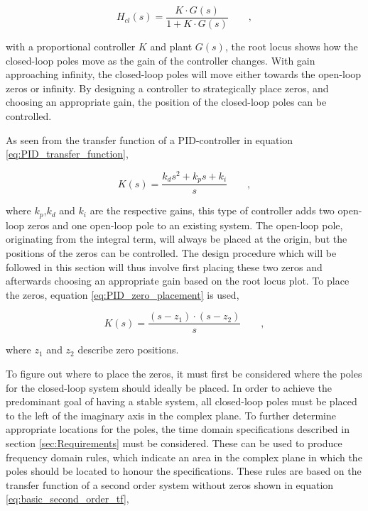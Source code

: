 \documentclass[../../main.tex]{subfiles}
\begin{document}
\begin{equation}\label{eq:closedLoopSystem}
    H_{cl}(s)=\frac{K\cdot G(s)}{1+K\cdot G(s)} \qquad ,
\end{equation}

with a proportional controller $K$ and plant $G(s)$, the root locus shows how the closed-loop poles move as the gain of the controller changes. With gain approaching infinity, the closed-loop poles will move either towards the open-loop zeros or infinity. By designing a controller to strategically place zeros, and choosing an appropriate gain, the position of the closed-loop poles can be controlled.

As seen from the transfer function of a PID-controller in equation \ref{eq:PID_transfer_function},

\begin{equation}\label{eq:PID_transfer_function}
    K(s) = \frac{k_d s^2 + k_p s + k_i}{s} \qquad ,
\end{equation}

where $k_p$,$k_d$ and $k_i$ are the respective gains, this type of controller adds two open-loop zeros and one open-loop pole to an existing system. The open-loop pole, originating from the integral term, will always be placed at the origin, but the positions of the zeros can be controlled. The design procedure which will be followed in this section will thus involve first placing these two zeros and afterwards choosing an appropriate gain based on the root locus plot. To place the zeros, equation \ref{eq:PID_zero_placement} is used, 

\begin{equation}\label{eq:PID_zero_placement}
    K(s) = \frac{(s-z_1)\cdot(s-z_2)}{s} \qquad ,
\end{equation}

where $z_1$ and $z_2$ describe zero positions.

To figure out where to place the zeros, it must first be considered where the poles for the closed-loop system should ideally be placed. In order to achieve the predominant goal of having a stable system, all closed-loop poles must be placed to the left of the imaginary axis in the complex plane. To further determine appropriate locations for the poles, the time domain specifications described in section \ref{sec:Requirements} must be considered. These can be used to produce frequency domain rules, which indicate an area in the complex plane in which the poles should be located to honour the specifications. These rules are based on the transfer function of a second order system without zeros shown in equation \ref{eq:basic_second_order_tf},
\end{document}
